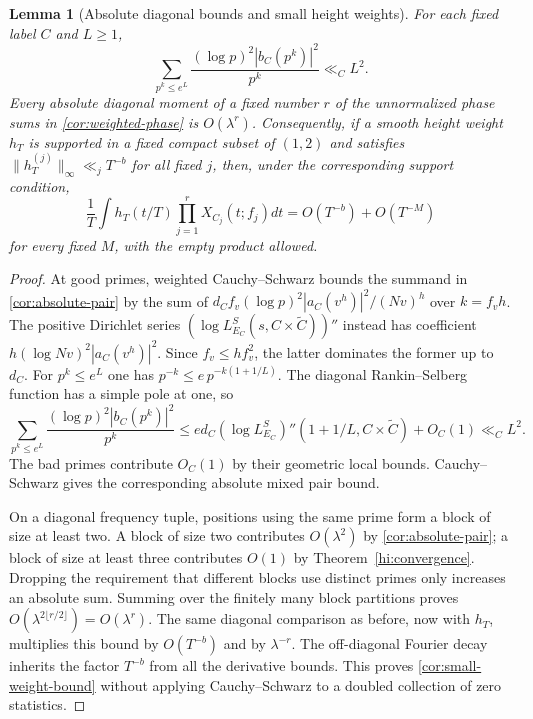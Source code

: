 \documentclass[11pt,reqno]{amsart}
\numberwithin{equation}{section}
\newtheorem{lemma}[theorem]{Lemma}
\theoremstyle{definition}
\theoremstyle{remark}
\begin{document}
\begin{lemma}[Absolute diagonal bounds and small height weights]\label{cor:small-weight}
For each fixed label $C$ and $L\ge1$,
\begin{equation}\sum_{p^k\le e^L}\frac{(\log p)^2|b_C(p^k)|^2}{p^k}\ll_C L^2.\label{cor:absolute-pair}\end{equation}
Every absolute diagonal moment of a fixed number $r$ of the unnormalized phase sums in \eqref{cor:weighted-phase} is $O(\lambda^r)$. Consequently, if a smooth height weight $h_T$ is supported in a fixed compact subset of $(1,2)$ and satisfies $\|h_T^{(j)}\|_\infty\ll_j T^{-b}$ for all fixed $j$, then, under the corresponding support condition,
\begin{equation}\frac1T\int h_T(t/T)\prod_{j=1}^rX_{C_j}(t;f_j)dt=O(T^{-b})+O(T^{-M})\label{cor:small-weight-bound}\end{equation}
for every fixed $M$, with the empty product allowed.
\end{lemma}
\begin{proof}
At good primes, weighted Cauchy--Schwarz bounds the summand in \eqref{cor:absolute-pair} by the sum of
$d_C f_v(\log p)^2|a_C(v^h)|^2/(Nv)^h$ over $k=f_vh$. The positive Dirichlet series $(\log L_{E_C}^S(s,C\times\widetilde C))''$ instead has coefficient $h(\log Nv)^2|a_C(v^h)|^2$. Since $f_v\le h f_v^2$, the latter dominates the former up to $d_C$. For $p^k\le e^L$ one has $p^{-k}\le e\,p^{-k(1+1/L)}$. The diagonal Rankin--Selberg function has a simple pole at one, so
\[
\sum_{p^k\le e^L}\frac{(\log p)^2|b_C(p^k)|^2}{p^k}
\le e d_C(\log L_{E_C}^S)''(1+1/L,C\times\widetilde C)+O_C(1)
\ll_C L^2.
\]
The bad primes contribute $O_C(1)$ by their geometric local bounds. Cauchy--Schwarz gives the corresponding absolute mixed pair bound.

On a diagonal frequency tuple, positions using the same prime form a block of size at least two. A block of size two contributes $O(\lambda^2)$ by \eqref{cor:absolute-pair}; a block of size at least three contributes $O(1)$ by Theorem~\ref{hi:convergence}. Dropping the requirement that different blocks use distinct primes only increases an absolute sum. Summing over the finitely many block partitions proves $O(\lambda^{2\lfloor r/2\rfloor})=O(\lambda^r)$. The same diagonal comparison as before, now with $h_T$, multiplies this bound by $O(T^{-b})$ and by $\lambda^{-r}$. The off-diagonal Fourier decay inherits the factor $T^{-b}$ from all the derivative bounds. This proves \eqref{cor:small-weight-bound} without applying Cauchy--Schwarz to a doubled collection of zero statistics.
\end{proof}
\end{document}
